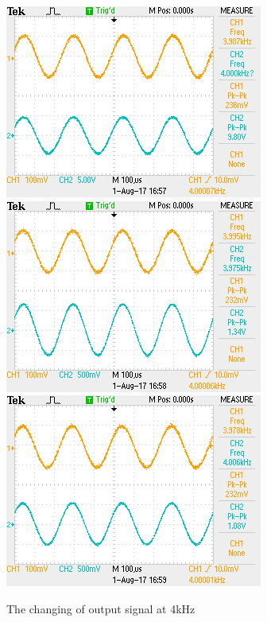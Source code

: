 \begin{figure}[!htbp]
	\centering
	\begin{framed}
		\includegraphics[width=\linewidth]{images/TEK0006.png}
		\includegraphics[width=\linewidth]{images/TEK0007.png}
		\includegraphics[width=\linewidth]{images/TEK0008.png}
		\caption{The changing of output signal at 4kHz}
		\label{fig:wave4k}
	\end{framed}
\end{figure}

